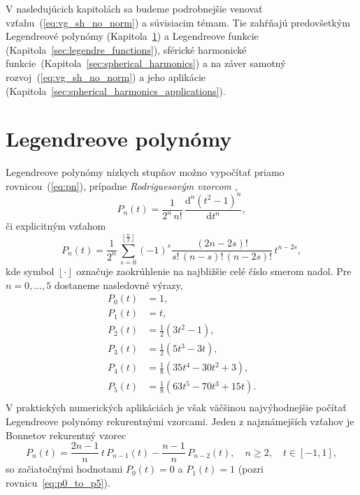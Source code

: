 \documentclass[a4paper, 12pt]{book}
\newcommand{\diff}{\mathrm d}
\begin{document}
V nasledujúcich kapitolách sa budeme podrobnejšie venovať 
vzťahu~(\ref{eq:vg_sh_no_norm}) a súvisiacim témam.  Tie zahŕňajú predovšetkým 
Legendreové polynómy (Kapitola~\ref{sec:legendre_polynomials}) a Legendreove 
funkcie (Kapitola~\ref{sec:legendre_functions}), sférické harmonické 
funkcie~(Kapitola~\ref{sec:spherical_harmonics}) a na záver samotný 
rozvoj~(\ref{eq:vg_sh_no_norm}) a jeho aplikácie 
(Kapitola~\ref{sec:spherical_harmonics_applications}).








\section{Legendreove polynómy}
\label{sec:legendre_polynomials}

Legendreove polynómy nízkych stupňov možno vypočítať priamo 
rovnicou~(\ref{eq:pn}), prípadne \emph{Rodriguesovým vzorcom} 
\citep{SansoGeoidDetermination},
%
\begin{equation}
\label{eq:pn_rodrigues}
P_n(t) = \frac{1}{2^n \, n!} \, \frac{\diff^n (t^2 - 1)^n}{\diff t^n}{,}
\end{equation}
%
či explicitným vzťahom \citep{Freeden2009}
%
\begin{equation}
P_n(t) = \frac{1}{2^n} \, \sum_{s = 0}^{\left\lfloor \frac{n}{2} \right\rfloor} 
(-1)^s \frac{(2n - 2s)!}{s!  \, (n - s)! \, (n - 2s)!} \, t^{n - 2s}{,}
\end{equation}
%
kde symbol $\left\lfloor \cdot \right\rfloor$ označuje zaokrúhlenie na 
najbližšie celé číslo smerom nadol.  Pre $n = 0, \dots, 5$ dostaneme nasledovné 
výrazy,
%
\begin{equation}
\label{eq:p0_to_p5}
\begin{split}
P_0(t) & = 1{,}\\
P_1(t) & = t{,}\\
P_2(t) & = \frac{1}{2} \left( 3t^2  - 1 \right){,}\\
P_3(t) & = \frac{1}{2} (5t^3 - 3t){,}\\
P_4(t) & = \frac{1}{8}(35t^4 - 30t^2 + 3){,}\\
P_5(t) & = \frac{1}{8}(63t^5 - 70t^3 + 15t){.}\\
\end{split}
\end{equation}
%
V praktických numerických aplikáciách je však väčšinou najvýhodnejšie počítať 
Legendreove polynómy rekurentnými vzorcami.  Jeden z najznámejších vzťahov je 
Bonnetov rekurentný vzorec
%
\begin{equation}
\label{eq:pn_bonnet}
P_n(t) = \frac{2n - 1}{n} \, t \, P_{n - 1}(t) - \frac{n - 1}{n} \, P_{n 
- 2}(t){,} \quad n \geq 2{,} \quad t \in [-1, 1]{,}
\end{equation}
%
so začiatočnými hodnotami $P_0(t) = 0$ a $P_1(t) = 1$ (pozri 
rovnicu~\ref{eq:p0_to_p5}).
\end{document}

